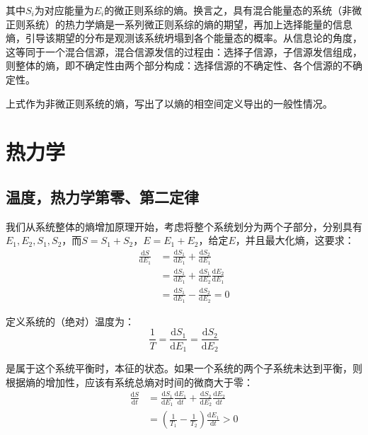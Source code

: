 \documentclass[UTF8]{ctexart}
\begin{document}
\begin{spacing}{2.0}
其中$S_{i}$为对应能量为$E_{i}$的微正则系综的熵。换言之，具有混合能量态的系统（非微正则系统）的热力学熵是一系列微正则系综的熵的期望，再加上选择能量的信息熵，引导该期望的分布是观测该系统坍塌到各个能量态的概率。从信息论的角度，这等同于一个混合信源，混合信源发信的过程由：选择子信源，子信源发信组成，则整体的熵，即不确定性由两个部分构成：选择信源的不确定性、各个信源的不确定性。

上式作为非微正则系统的熵，写出了以熵的相空间定义导出的一般性情况。

\newpage
\section{热力学}
\subsection{温度，热力学第零、第二定律}
我们从系统整体的熵增加原理开始，考虑将整个系统划分为两个子部分，分别具有$E_{1},E_{2},S_{1},S_{2}$，而$S=S_{1}+S_{2}$，$E=E_{1}+E_{2}$，给定$E$，并且最大化熵，这要求：
\begin{equation}
\begin{aligned}
\frac{\text{d}S}{\text{d}E_{1}}&=\frac{\text{d}S_{1}}{\text{d}E_{1}}+\frac{\text{d}S_{2}}{\text{d}E_{1}}\\
&=\frac{\text{d}S_{1}}{\text{d}E_{1}}+\frac{\text{d}S_{1}}{\text{d}E_{2}}\frac{\text{d}E_{2}}{\text{d}E_{1}} \\
&=\frac{\text{d}S_{1}}{\text{d}E_{1}}-\frac{\text{d}S_{2}}{\text{d}E_{2}}=0
\end{aligned}
\end{equation}

定义系统的（绝对）温度为：
\begin{equation}
\frac{1}{T}=\frac{\text{d}S_{1}}{\text{d}E_{1}}=\frac{\text{d}S_{2}}{\text{d}E_{2}}
\end{equation}

是属于这个系统平衡时，本征的状态。如果一个系统的两个子系统未达到平衡，则根据熵的增加性，应该有系统总熵对时间的微商大于零：
\begin{equation}
\begin{aligned}
\frac{\text{d}S}{\text{d}t}&= \frac{\text{d}S_{1}}{\text{d}E_{1}}\frac{\text{d}E_{1}}{\text{d}t}+\frac{\text{d}S_{2}}{\text{d}E_{2}}\frac{\text{d}E_{2}}{\text{d}t}\\
&=(\frac{1}{T_{1}}-\frac{1}{T_{2}})\frac{\text{d}E_{1}}{\text{d} t}>0
\end{aligned}
\end{equation}


\end{spacing}
\end{document}
